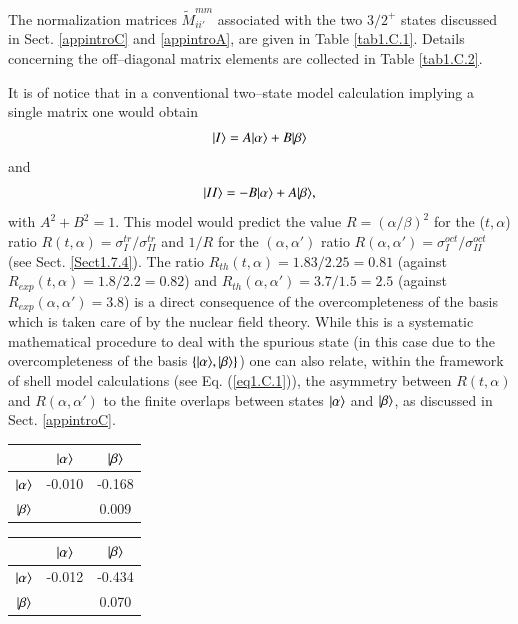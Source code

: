 \begin{subappendices}
 
 The normalization matrices $\tilde M_{ii'}^{mm}$ associated with the two $3/2^+$ states discussed in Sect. \ref{appintroC} and \ref{appintroA}, are given in Table \ref{tab1.C.1}. Details concerning the off--diagonal matrix elements are collected in Table \ref{tab1.C.2}.
 
 
 It is of notice that in a conventional two--state model calculation implying a single matrix one would obtain
 \begin{align}
\nonumber|{I} \rangle=A|{\alpha} \rangle+B|{\beta} \rangle
 \end{align}
and
 \begin{align}\label{eq1.C.6}
|{II} \rangle=-B|{\alpha} \rangle+A|{\beta} \rangle,
 \end{align}
with $A^2+B^2=1$. This model would predict the value $R=(\alpha/\beta)^2$ for the ($t,\alpha$) ratio $R(t,\alpha)=\sigma_I^{tr}/\sigma^{tr}_{II}$ and $1/R$ for the $(\alpha,\alpha')$ ratio   $R(\alpha,\alpha')=\sigma_I^{oct}/\sigma_{II}^{oct}$ (see Sect. \ref{Sect1.7.4}). The ratio $R_{th}(t,\alpha)=1.83/2.25=0.81$ (against $R_{exp}(t,\alpha)=1.8/2.2=0.82$) and $R_{th}(\alpha,\alpha')=3.7/1.5=2.5$ (against $R_{exp}(\alpha,\alpha')=3.8$) is a direct consequence of the overcompleteness of the basis which is taken care of by the nuclear field theory. While this is a systematic mathematical procedure to deal with the spurious state (in this case due to the overcompleteness of the basis $\left\{|{\alpha} \rangle,|{\beta} \rangle\right\}$) one can also relate, within the framework of shell model calculations (see Eq. (\ref{eq1.C.1})), the asymmetry between $R(t,\alpha)$ and $R(\alpha,\alpha')$ to the finite overlaps between states $|{\alpha} \rangle$ and $|{\beta} \rangle$, as discussed in Sect. \ref{appintroC}.
\begin{table}
\begin{tabular}{|c|c|c|}
 \hline 
  & $|{\alpha} \rangle$ & $|{\beta} \rangle$ \\
 \hline 
$|{\alpha} \rangle$ &-0.010 & -0.168    \\ 
 \hline
$|{\beta} \rangle$&  & 0.009 \\ 
 \hline
\end{tabular}
\begin{tabular}{|c|c|c|}
 \hline 
  & $|{\alpha} \rangle$ & $|{\beta} \rangle$ \\
 \hline 
$|{\alpha} \rangle$ &-0.012 & -0.434    \\ 
 \hline
$|{\beta} \rangle$&  & 0.070 \\ 
 \hline
\end{tabular}
\begin{tabular}{|c|c|c|}

\end{tabular}
\end{table}
\end{subappendices}
